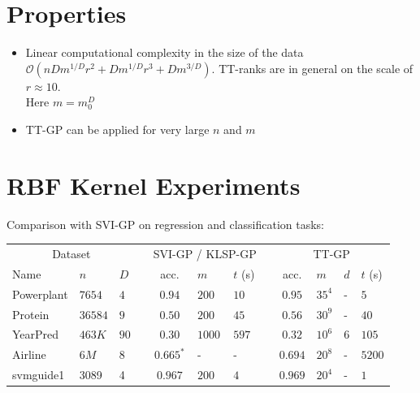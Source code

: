 \documentclass[a0,portrait]{a0poster}
\newcommand{\bigO}{\mathcal{O}}
\begin{document}
\begin{multicols}{2}
\section*{\LARGE \color{NavyBlue} Properties}
    
\begin{itemize}
  \item Linear computational complexity in the size of the data
    $\bigO(n D m^{1 / D} r^2 + D m^{1 / D} r^3 + D m^{3 / D})$. 
    TT-ranks are in general on the scale of $r \approx 10$.\\ 
    Here $m = m_0^D$
  \item TT-GP can be applied for very large $n$ and $m$
\end{itemize}

\section*{\LARGE \color{NavyBlue} RBF Kernel Experiments}

Comparison with SVI-GP \citep{hensman2013} on regression and classification
tasks:

\begin{center}
  \begin{tabular}{lll l cll l clll}
    \toprule
    \multicolumn{3}{c}{Dataset} && \multicolumn{3}{c}{SVI-GP / KLSP-GP} && \multicolumn{4}{c}{TT-GP} \\
    \cmidrule{1-3}
    \cmidrule{5-7}
    \cmidrule{9-12}

    Name & $n$ & $D$ &&
    acc. & $m$ & $t$ (s) &&
    acc. & $m$ & $d$ & $t$ (s)\\
    \midrule

    Powerplant & $7654$ & $4$ &&
    $0.94$ & $200$ & $10$ &&
    $\mathbf{0.95}$ & $35^4$ & - & $5$ \\

    Protein & $36584$ & $9$ &&
    $0.50$ & $200$ & $45$ &&
    $\mathbf{0.56}$ & $30^9$ & - & $40$ \\

    YearPred & $463K$ & $90$ &&
    $0.30$ & $1000$ & $597$ &&
    $\mathbf{0.32}$ & $10^6$ & $6$ & $105$ \\

    \midrule
    Airline & $6M$ & $8$ &&
    $0.665^*$ & - & - &&
    $\mathbf{0.694}$ & $20^8$ & - & $5200$ \\

    svmguide1 & 3089 & 4 &&
    $0.967$ & $200$ & $4$ &&
    $\mathbf{0.969}$ & $20^4$ & - & $1$\\


\end{tabular}
\end{center}
\end{multicols}
\end{document}
